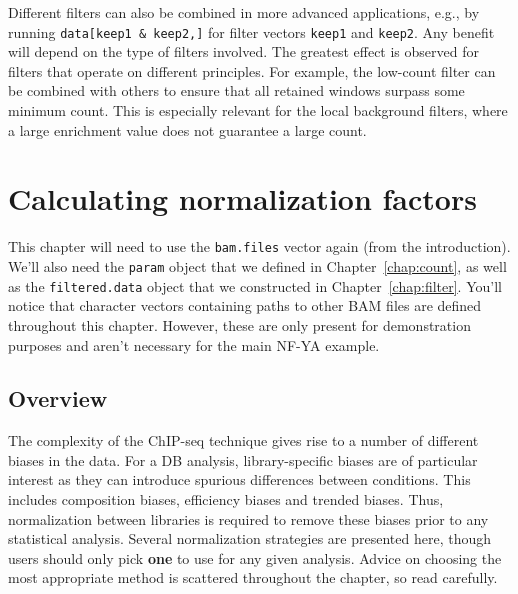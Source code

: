 \documentclass[12pt]{report}
\newcommand{\code}[1]{{\small\texttt{#1}}}
\newenvironment{combox}
{ \begin{shaded}\begin{center}\begin{minipage}[t]{0.95\textwidth} }
{ \end{minipage}\end{center}\end{shaded} }
\begin{document}
Different filters can also be combined in more advanced applications, e.g., by running \code{data[keep1 \& keep2,]} for filter vectors \code{keep1} and \code{keep2}.
Any benefit will depend on the type of filters involved.
The greatest effect is observed for filters that operate on different principles.
For example, the low-count filter can be combined with others to ensure that all retained windows surpass some minimum count.
This is especially relevant for the local background filters, where a large enrichment value does not guarantee a large count.



\chapter{Calculating normalization factors}
\label{chap:norm}
\begin{combox}
This chapter will need to use the \code{bam.files} vector again (from the introduction). 
We'll also need the \code{param} object that we defined in Chapter~\ref{chap:count}, as well as the \code{filtered.data} object that we constructed in Chapter~\ref{chap:filter}.
You'll notice that character vectors containing paths to other BAM files are defined throughout this chapter. 
However, these are only present for demonstration purposes and aren't necessary for the main NF-YA example.
\end{combox}

\section{Overview}
The complexity of the ChIP-seq technique gives rise to a number of different biases in the data.
For a DB analysis, library-specific biases are of particular interest as they can introduce spurious differences between conditions.
This includes composition biases, efficiency biases and trended biases.
Thus, normalization between libraries is required to remove these biases prior to any statistical analysis.
Several normalization strategies are presented here, though users should only pick \textbf{one} to use for any given analysis.
Advice on choosing the most appropriate method is scattered throughout the chapter, so read carefully.
\end{document}
